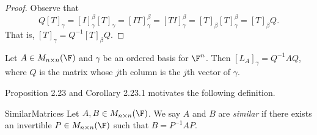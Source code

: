 \documentclass[linearalgebraI]{subfiles}
\begin{document}
    \begin{proof}
        Observe that
        \begin{equation*}
            Q\left[ T \right] _\gamma = \left[ I \right] ^\beta_\gamma\left[ T \right] _\gamma = \left[ IT \right] ^\beta_\gamma = \left[ TI \right] ^\beta_\gamma = \left[ T \right] _\beta\left[ T \right] ^\beta_\gamma = \left[ T \right]_\beta Q.
        \end{equation*}
        That is, $[T]_{\gamma} = Q^{-1} [T]_\beta Q$.
    \end{proof}

    \begin{cor}{}
        Let $A\in M_{n\times n}(\F)$ and $\gamma$ be an ordered basis for $\F^n$. Then $[L_A]_\gamma = Q^{-1} AQ$, where $Q$ is the matrix whose $j$th column is the $j$th vector of $\gamma$.
    \end{cor}

    \begin{remark}
        Proposition 2.23 and Corollary 2.23.1 motivates the following definition.
    \end{remark}

    \begin{definition}{Similar}{Matrices}
        Let $A,B\in M_{n\times n}(\F)$. We say $A$ and $B$ are \emph{similar} if there exists an invertible $P\in M_{n\times n}(\F)$ such that $B=P^{-1} AP$.
    \end{definition}
\end{document}
